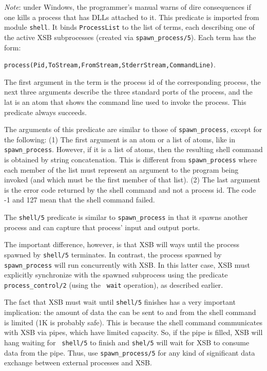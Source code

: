 \begin{description}
    \emph{Note}: under Windows, the programmer's manual warns of dire
    consequences if one kills a process that has DLLs attached to it.
    This predicate is imported from module {\tt shell}.
    It binds {\tt ProcessList} to the list of terms, each describing one of
    the active XSB subprocesses (created via \verb|spawn_process/5|).
    Each term has the form:
    \begin{center}
      \verb|process(Pid,ToStream,FromStream,StderrStream,CommandLine)|. 
    \end{center}
    The first argument in the term is the process id of the corresponding
    process, the next three arguments describe the three standard ports
    of the process, and the lat is an atom that shows the command line used
    to invoke the process.
    This predicate always succeeds.

    The arguments of this predicate are similar to those of
    \verb|spawn_process|, except for the following:
    (1) The first argument is an atom or a list of atoms, like in
    \verb|spawn_process|. However, if it is a list of atoms, then the
    resulting shell command is obtained by string concatenation. This is
    different from \verb|spawn_process| where each member of the list must
    represent an argument to the program being invoked (and which must be
    the first member of that list).  (2) The last argument is the error
    code returned by the shell command and not a process id. The code -1
    and 127 mean that the shell command failed.
    
    The {\tt shell/5} predicate is similar to \verb|spawn_process| in that
    it spawns another process and can capture that process' input and
    output ports.
    
    The important difference, however, is that XSB will ways until the
    process spawned by {\tt shell/5} terminates. In contrast, the process
    spawned by \verb|spawn_process| will run concurrently with XSB.  In
    this latter case, XSB must explicitly synchronize with the spawned
    subprocess using the predicate \verb|process_control/2| (using the {\tt
      wait} operation), as described earlier.
    
    The fact that XSB must wait until {\tt shell/5} finishes has a very
    important implication: the amount of data the can be sent to and from
    the shell command is limited (1K is probably safe). This is because the
    shell command communicates with XSB via pipes, which have limited
    capacity.  So, if the pipe is filled, XSB will hang waiting for {\tt
      shell/5} to finish and {\tt shel/5} will wait for XSB to consume data
    from the pipe.  Thus, use \verb|spawn_process/5| for any kind of
    significant data exchange between external processes and XSB.
  

\end{description}
